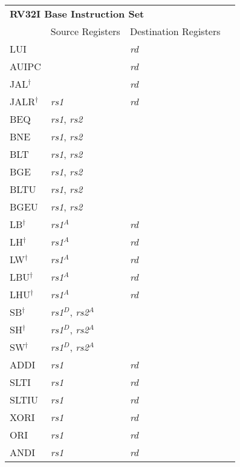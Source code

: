 \begin{tabular}{p{25mm}|p{3cm}|p{6cm}|p{4cm}}
  \multicolumn{4}{l}{\bf RV32I Base Instruction Set} \\
  \cline{2-3}
   & Source Registers & Destination Registers \\
  \cline{2-3}
   LUI &  & {\em rd} &  \\
   \cline{2-3}
   AUIPC &  & {\em rd} &  \\
   \cline{2-3}
   JAL$^\dagger$ &  & {\em rd} & \\
   \cline{2-3}
   JALR$^\dagger$ & {\em rs1} & {\em rd} & \\
   \cline{2-3}
   BEQ & {\em rs1}, {\em rs2} &  &  \\
   \cline{2-3}
   BNE & {\em rs1}, {\em rs2} &  &  \\
   \cline{2-3}
   BLT & {\em rs1}, {\em rs2} &  &  \\
   \cline{2-3}
   BGE & {\em rs1}, {\em rs2} &  &  \\
   \cline{2-3}
   BLTU & {\em rs1}, {\em rs2} &  &  \\
   \cline{2-3}
   BGEU & {\em rs1}, {\em rs2} &  &  \\
   \cline{2-3}
   LB$^\dagger$ & {\em rs1}$^A$ & {\em rd} &  \\
   \cline{2-3}
   LH$^\dagger$ & {\em rs1}$^A$ & {\em rd} &  \\
   \cline{2-3}
   LW$^\dagger$ & {\em rs1}$^A$ & {\em rd} &  \\
   \cline{2-3}
   LBU$^\dagger$ & {\em rs1}$^A$ & {\em rd} &  \\
   \cline{2-3}
   LHU$^\dagger$ & {\em rs1}$^A$ & {\em rd} &  \\
   \cline{2-3}
   SB$^\dagger$ & {\em rs1}$^D$, {\em rs2}$^A$ &  &  \\
   \cline{2-3}
   SH$^\dagger$ & {\em rs1}$^D$, {\em rs2}$^A$ &  &  \\
   \cline{2-3}
   SW$^\dagger$ & {\em rs1}$^D$, {\em rs2}$^A$ &  &  \\
   \cline{2-3}
   ADDI & {\em rs1} & {\em rd} &  \\
   \cline{2-3}
   SLTI & {\em rs1} & {\em rd} &  \\
   \cline{2-3}
   SLTIU & {\em rs1} & {\em rd} &  \\
   \cline{2-3}
   XORI & {\em rs1} & {\em rd} &  \\
   \cline{2-3}
   ORI & {\em rs1} & {\em rd} &  \\
   \cline{2-3}
   ANDI & {\em rs1} & {\em rd} &  \\

\end{tabular}
